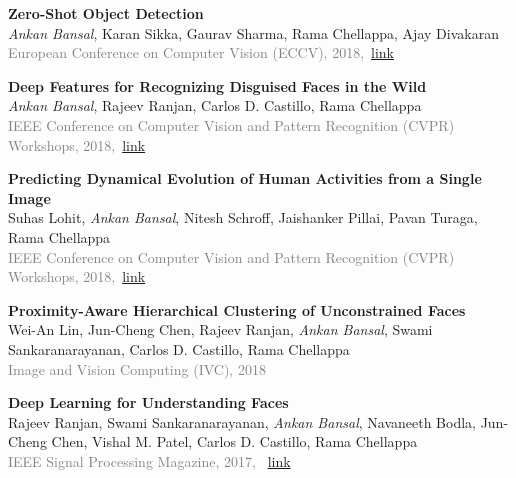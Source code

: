 \documentclass[11pt, a4paper]{article}
\begin{document}
\textbf{Zero-Shot Object Detection}\\
\textit{Ankan Bansal}, Karan Sikka, Gaurav Sharma, Rama Chellappa, Ajay Divakaran\\
\textcolor{gray}{European Conference on Computer Vision (ECCV), 2018,}~\href{http://openaccess.thecvf.com/content_ECCV_2018/html/Ankan_Bansal_Zero-Shot_Object_Detection_ECCV_2018_paper.html}{link}

\vspace{4pt}

\textbf{Deep Features for Recognizing Disguised Faces in the Wild} \\
\textit{Ankan Bansal}, Rajeev Ranjan, Carlos D. Castillo, Rama Chellappa\\
\textcolor{gray}{IEEE Conference on Computer Vision and Pattern Recognition (CVPR) Workshops,
2018,}~\href{http://openaccess.thecvf.com/content_cvpr_2018_workshops/w1/html/Bansal_Deep_Features_for_CVPR_2018_paper.html}{link}

\vspace{4pt}

\textbf{Predicting Dynamical Evolution of Human Activities from a Single Image} \\
Suhas Lohit, \textit{Ankan Bansal}, Nitesh Schroff, Jaishanker Pillai, Pavan Turaga, Rama
Chellappa\\
\textcolor{gray}{IEEE Conference on Computer Vision and Pattern Recognition (CVPR) Workshops,
2018,}~\href{http://openaccess.thecvf.com/content_cvpr_2018_workshops/w10/html/Lohit_Predicting_Dynamical_Evolution_CVPR_2018_paper.html}{link}

\vspace{4pt}

\textbf{Proximity-Aware Hierarchical Clustering of Unconstrained Faces} \\
Wei-An Lin, Jun-Cheng Chen, Rajeev Ranjan, \textit{Ankan Bansal}, Swami Sankaranarayanan, Carlos D.
Castillo, Rama Chellappa\\
\textcolor{gray}{Image and Vision Computing (IVC), 2018}

\vspace{4pt}

\textbf{Deep Learning for Understanding Faces} \\
Rajeev Ranjan, Swami Sankaranarayanan, \textit{Ankan Bansal}, Navaneeth Bodla, Jun-Cheng Chen, Vishal
M. Patel,  Carlos D. Castillo, Rama Chellappa\\
\textcolor{gray}{IEEE Signal Processing Magazine, 2017,} ~\href{https://ieeexplore.ieee.org/abstract/document/8253595}{link}
\end{document}
